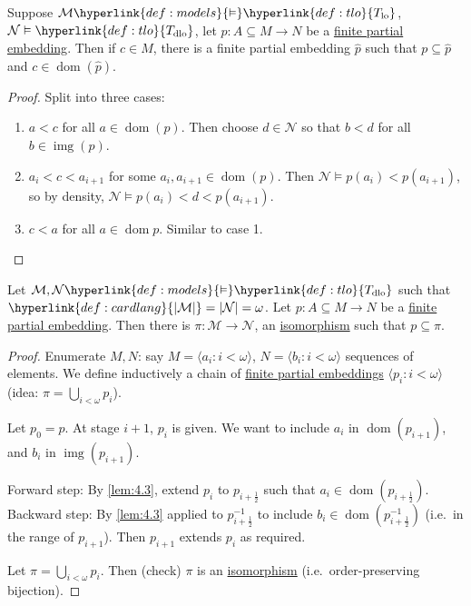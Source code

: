 \documentclass{article}
\let\models\vDash
\DeclareMathOperator{\dom}{dom}
\DeclareMathOperator{\img}{img}
\begin{document}
\begin{nlemma}\label{lem:4.3}
  Suppose $\mathcal{M} \hyperlink{def:models}{\models} \hyperlink{def:tlo}{T_{\text{lo}}}$, $\mathcal{N} \models \hyperlink{def:tlo}{T_{\text{dlo}}}$, let $p: A \subseteq M \to N$ be a \hyperlink{def:pe}{finite partial embedding}.
  Then if $c \in M$, there is a finite partial embedding $\hat{p}$ such that $p \subseteq \hat{p}$ and $c \in \dom(\hat{p})$.
\end{nlemma}
\begin{proof}
  Split into three cases:
  \begin{enumerate}[label=\arabic*.]
    \item $a < c$ for all $a \in \dom(p)$. Then choose $d \in \mathcal{N}$ so that $b < d$ for all $b \in \img(p)$.
    \item $a_i < c < a_{i+1}$ for some $a_i, a_{i+1} \in \dom(p)$.
      Then $\mathcal{N} \models p(a_i) < p(a_{i+1})$, so by density, $\mathcal{N} \models p(a_i) < d < p(a_{i+1})$.
     \item $c<a$ for all $a \in \dom p$. Similar to case 1. \qedhere
  \end{enumerate}
\end{proof}
\begin{nthm}\label{thm:4.4}
  Let $\mathcal{M}, \mathcal{N} \hyperlink{def:models}{\models} \hyperlink{def:tlo}{T_{\text{dlo}}}$ such that $\hyperlink{def:cardlang}{|\mathcal{M}|} = |\mathcal{N}| = \omega$.
  Let $p: A \subseteq M \to N$ be a \hyperlink{def:pe}{finite partial embedding}.
  Then there is $\pi: \mathcal{M} \to \mathcal{N}$, an \hyperlink{def:iso}{isomorphism} such that $p \subseteq \pi$.
\end{nthm}
\begin{proof}
  Enumerate $M, N$:
  say $M = \langle a_i : i < \omega \rangle$, $N = \langle b_i : i < \omega \rangle$ sequences of elements.
  We define inductively a chain of \hyperlink{def:pe}{finite partial embeddings} $\langle p_i : i < \omega \rangle$ (idea: $\pi = \bigcup_{i < \omega} p_i$).

  Let $p_0 = p$.
  At stage $i+1$, $p_i$ is given. We want to include $a_i$ in $\dom(p_{i+1})$, and $b_i$ in $\operatorname{img}(p_{i+1})$.

  Forward step: By \cref{lem:4.3}, extend $p_i$ to $p_{i+\frac{1}{2}}$ such that $a_i \in \dom(p_{i + \frac{1}{2}})$.
  Backward step: By \cref{lem:4.3} applied to $p_{i+\frac{1}{2}}^{-1}$ to include $b_i \in \dom(p_{i+\frac{1}{2}}^{-1})$ (i.e.\ in the range of $p_{i+1}$).
Then $p_{i+1}$ extends $p_i$ as required.

  Let $\pi = \bigcup_{i < \omega} p_i$. Then (check) $\pi$ is an \hyperlink{def:iso}{isomorphism} (i.e.\ order-preserving bijection).
\end{proof}
\end{document}
